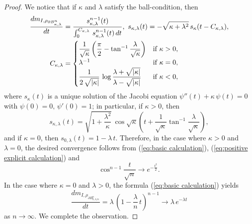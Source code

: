 \begin{proof}
We notice that
if $\kappa$ and $\lambda$ satisfy the ball-condition,
then
\begin{align}\label{eq:basic calculation}
\frac{d m_{I,\rho_{ \partial B^{n}_{\kappa,\lambda}    }}    }{dt}&=\frac{s^{n-1}_{\kappa,\lambda}(t)}{\int^{C_{\kappa,\lambda}}_{0}\,s^{n-1}_{\kappa,\lambda}(t)\,dt          },\,\, s_{\kappa,\lambda}(t)=-\sqrt{\kappa+\lambda^{2}}\,s_{\kappa}(t-C_{\kappa,\lambda}),\\ \notag
C_{\kappa,\lambda}&=\begin{cases}
                                       \dfrac{1}{\sqrt{\kappa}}\left(\dfrac{\pi}{2}-\tan^{-1}\dfrac{\lambda}{\sqrt{\kappa}} \right) & \text{if $\kappa>0$}, \\
                                       \lambda^{-1}                         & \text{if $\kappa =0$},\\
                                       \dfrac{1}{2\,\sqrt{\vert \kappa \vert}}\,\log \dfrac{\lambda+\sqrt{\vert \kappa \vert}}{\lambda-\sqrt{\vert \kappa \vert}} & \text{if $\kappa<0$},
                                   \end{cases}
\end{align}
where $s_{\kappa}(t)$ is a unique solution of the Jacobi equation $\psi''(t)+\kappa\, \psi(t)=0$ with $\psi(0)=0,\,\psi'(0)=1$;
in particular,
if $\kappa>0$,
then
\begin{equation}\label{eq:positive explicit calculation}
s_{\kappa,\lambda}(t)=\sqrt{1+\frac{\lambda^{2}}{\kappa}}\,\cos\sqrt{\kappa} \left(t+\frac{1}{\sqrt{\kappa} }\tan^{-1}  \frac{\lambda}{\sqrt{\kappa}} \right),
\end{equation}
and if $\kappa=0$,
then $s_{0,\lambda}(t)=1-\lambda\,t$.
Therefore,
in the case where $\kappa>0$ and $\lambda=0$,
the desired convergence follows from (\ref{eq:basic calculation}), (\ref{eq:positive explicit calculation}) and
\begin{equation*}
\cos^{n-1}\frac{t}{\sqrt{n}}\to e^{-\frac{t^{2}}{2}}.
\end{equation*}
In the case where $\kappa=0$ and $\lambda>0$,
the formula (\ref{eq:basic calculation}) yields
\begin{equation*}
\frac{d m_{I,\rho_{  \partial B^{n}_{0,\lambda/n   }     }}    }{dt}=\lambda\,\left(1-\frac{\lambda}{n}\,t \right)^{n-1}\to \lambda\, e^{-\lambda t}
\end{equation*}
as $n\to \infty$.
We complete the observation.
\end{proof}

